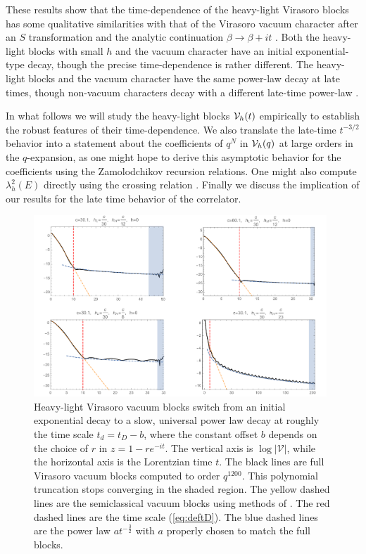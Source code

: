 These results show that the time-dependence of the heavy-light Virasoro blocks has some qualitative similarities with that of the Virasoro vacuum character after an $S$ transformation and the analytic continuation $\beta \to \beta + i t$ \cite{Dyer:2016pou}.  Both the heavy-light blocks with small $h$ and the vacuum character have an initial exponential-type decay, though the precise time-dependence is rather different.  The heavy-light blocks and the vacuum character have the same power-law decay at late times, though non-vacuum characters decay with a different late-time power-law \cite{Dyer:2016pou}.

In what follows we will study the heavy-light blocks ${\cal V}_h(t)$ empirically to establish the robust features of their time-dependence.  We also translate the late-time $t^{-3/2}$ behavior into a statement about the coefficients of $q^N$ in ${\cal V}_h(q)$ at large orders in the $q$-expansion, as one might hope to derive this asymptotic behavior for the coefficients using the Zamolodchikov recursion relations.  One might also compute $\lambda_h^2(E)$ directly using the crossing relation \cite{Ponsot:1999uf, Teschner:2003en}. Finally  we discuss the implication of our results for the  late time behavior of the correlator.


\begin{figure}[h]
\begin{centering}
\includegraphics[width=0.98\textwidth]{virasoro_chapter/VBlock}
\caption{Heavy-light Virasoro vacuum blocks switch from an initial exponential decay to a slow, universal power law decay at roughly the time scale $t_d = t_D - b$, where the constant offset $b$ depends on the choice of $r$ in $z = 1 - re^{-it}$. The vertical axis is $\log|\mathcal{V}|$, while the horizontal axis is the Lorentzian time $t$. The black lines are full Virasoro vacuum blocks computed to order $q^{1200}$. This polynomial truncation stops converging in the shaded region. The yellow dashed lines are the semiclassical vacuum blocks using methods of \cite{Fitzpatrick:2016mjq}. The red dashed lines are the time scale (\ref{eq:deftD}). The blue dashed lines are the power law $a t^{-\frac{3}{2}}$ with $a$ properly chosen to match the full blocks.  }
\label{fig:VBlock}
\end{centering}
\end{figure}

